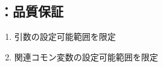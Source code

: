 \subsection{\KKeywayConerLeft：品質保証}
\begin{enumerate}[label*=\sarrow]
\item {}引数の設定可能範囲を限定
\item 関連コモン変数の設定可能範囲を限定
\end{enumerate}
